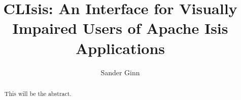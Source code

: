 \documentclass{uva_bachelor_thesis}
\title{CLIsis: An Interface for Visually Impaired Users of Apache Isis Applications}
\author{Sander Ginn}
\begin{document}
\maketitle

\begin{abstract}
This will be the abstract.
\end{abstract}

\tableofcontents










\printglossaries

\end{document}
